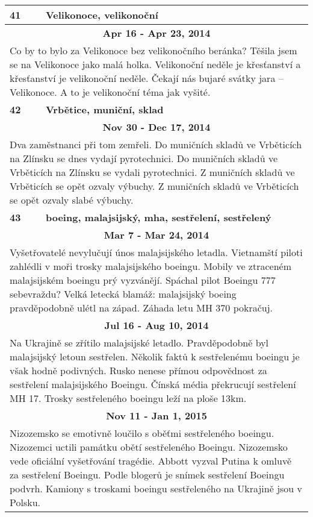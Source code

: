 \begin{tabularx}{\linewidth}{l l}
\bf 41 & \bf Velikonoce, velikonoční \\ \midrule
\multicolumn{2}{c}{\bf Apr 16 - Apr 23, 2014} \\
\multicolumn{2}{p{\linewidth}}{Co by to bylo za Velikonoce bez velikonočního beránka? Těšila jsem se na Velikonoce jako malá holka. Velikonoční neděle je křesťanství a křesťanství je velikonoční neděle. Čekají nás bujaré svátky jara – Velikonoce. A to je velikonoční téma jak vyšité.} \\ \midrule[1.5pt]

\bf 42 & \bf Vrbětice, muniční, sklad \\ \midrule
\multicolumn{2}{c}{\bf Nov 30 - Dec 17, 2014} \\
\multicolumn{2}{p{\linewidth}}{Dva zaměstnanci při tom zemřeli. Do muničních skladů ve Vrběticích na Zlínsku se dnes vydají pyrotechnici. Do muničních skladů ve Vrběticích na Zlínsku se vydali pyrotechnici. Z muničních skladů ve Vrběticích se opět ozvaly výbuchy. Z muničních skladů ve Vrběticích se opět ozvaly slabé výbuchy.} \\ \midrule[1.5pt]

\bf 43 & \bf boeing, malajsijský, mha, sestřelení, sestřelený \\ \midrule
\multicolumn{2}{c}{\bf Mar 7 - Mar 24, 2014} \\
\multicolumn{2}{p{\linewidth}}{Vyšetřovatelé nevylučují únos malajsijského letadla. Vietnamští piloti zahlédli v moři trosky malajsijského boeingu. Mobily ve ztraceném malajsijském boeingu prý vyzvánějí. Spáchal pilot Boeingu 777 sebevraždu? Velká letecká blamáž: malajsijský boeing pravděpodobně ulétl na západ. Záhada letu MH 370 pokračuj.} \\ \midrule
\multicolumn{2}{c}{\bf Jul 16 - Aug 10, 2014} \\
\multicolumn{2}{p{\linewidth}}{Na Ukrajině se zřítilo malajsijské letadlo. Pravděpodobně byl malajsijský letoun sestřelen. Několik faktů k sestřelenému boeingu je však hodně podivných. Rusko nenese přímou odpovědnost za sestřelení malajsijského Boeingu. Čínská média překrucují sestřelení MH 17. Trosky sestřeleného boeingu leží na ploše 13km.} \\ \midrule
\multicolumn{2}{c}{\bf Nov 11 - Jan 1, 2015} \\
\multicolumn{2}{p{\linewidth}}{Nizozemsko se emotivně loučilo s oběťmi sestřeleného boeingu. Nizozemci uctili památku obětí sestřeleného Boeingu. Nizozemsko vede oficiální vyšetřování tragédie. Abbott vyzval Putina k omluvě za sestřelení Boeingu. Podle blogerů je snímek sestřelení Boeingu podvrh. Kamiony s troskami boeingu sestřeleného na Ukrajině jsou v Polsku.} \\ \midrule[1.5pt]


\end{tabularx}
